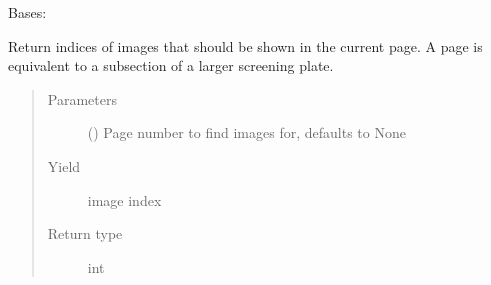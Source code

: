 \documentclass[letterpaper,10pt,english]{sphinxmanual}
\begin{document}
\begin{fulllineitems}
\label{\detokenize{polo.widgets:polo.widgets.plate_viewer.plateViewer}}
Bases: 

\begin{fulllineitems}
\label{\detokenize{polo.widgets:polo.widgets.plate_viewer.plateViewer._get_visible_wells}}
Return indices of images that should be shown in the
current page. A page is equivalent to a subsection of a
larger screening plate.
\begin{quote}\begin{description}
\item[{Parameters}] \leavevmode
{} (\sphinxstyleliteralemphasis{\sphinxupquote{, }}) \textendash{} Page number to find images for, defaults to None

\item[{Yield}] \leavevmode
image index

\item[{Return type}] \leavevmode
int

\end{description}\end{quote}

\end{fulllineitems}



\end{fulllineitems}
\end{document}
